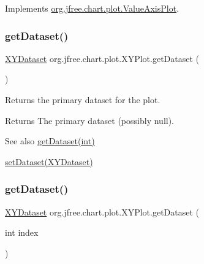 Implements \mbox{\hyperlink{interfaceorg_1_1jfree_1_1chart_1_1plot_1_1_value_axis_plot_a54815b2f078c11b2618804fe3e7e5353}{org.\+jfree.\+chart.\+plot.\+Value\+Axis\+Plot}}.

\mbox{\label{classorg_1_1jfree_1_1chart_1_1plot_1_1_x_y_plot_a109d6defa2ec268944bd4d15ed6129cc}} 
\subsubsection{\texorpdfstring{get\+Dataset()}{getDataset()}\hspace{0.1cm}{\footnotesize\ttfamily [1/2]}}
{\footnotesize\ttfamily \mbox{\hyperlink{interfaceorg_1_1jfree_1_1data_1_1xy_1_1_x_y_dataset}{X\+Y\+Dataset}} org.\+jfree.\+chart.\+plot.\+X\+Y\+Plot.\+get\+Dataset (\begin{DoxyParamCaption}{ }\end{DoxyParamCaption})}

Returns the primary dataset for the plot.

\begin{DoxyReturn}{Returns}
The primary dataset (possibly {\ttfamily null}).
\end{DoxyReturn}
\begin{DoxySeeAlso}{See also}
\mbox{\hyperlink{classorg_1_1jfree_1_1chart_1_1plot_1_1_x_y_plot_ace9e15aa124f2cb7565d8a133c25ea77}{get\+Dataset(int)}} 

\mbox{\hyperlink{classorg_1_1jfree_1_1chart_1_1plot_1_1_x_y_plot_ab26bacaaabe2637cdca239a6f3fff791}{set\+Dataset(\+X\+Y\+Dataset)}} 
\end{DoxySeeAlso}
\mbox{\label{classorg_1_1jfree_1_1chart_1_1plot_1_1_x_y_plot_ace9e15aa124f2cb7565d8a133c25ea77}} 
\subsubsection{\texorpdfstring{get\+Dataset()}{getDataset()}\hspace{0.1cm}{\footnotesize\ttfamily [2/2]}}
{\footnotesize\ttfamily \mbox{\hyperlink{interfaceorg_1_1jfree_1_1data_1_1xy_1_1_x_y_dataset}{X\+Y\+Dataset}} org.\+jfree.\+chart.\+plot.\+X\+Y\+Plot.\+get\+Dataset (\begin{DoxyParamCaption}\item[{int}]{index }\end{DoxyParamCaption})}

